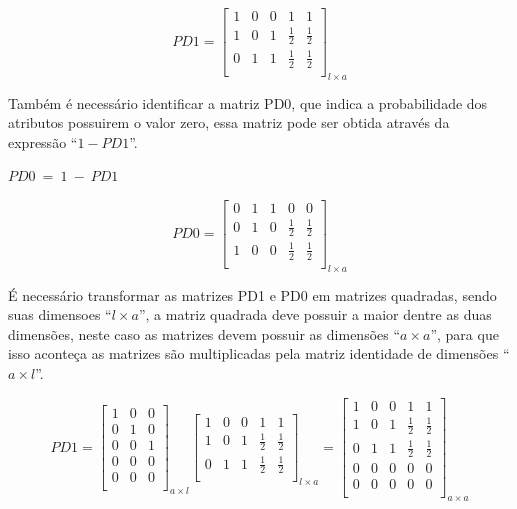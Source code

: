 $$PD1=\left[
\begin{array}{ccccc}
1 & 0 & 0 & 1 & 1 \\
1 & 0 & 1 & \frac{1}{2} & \frac{1}{2} \\
0 & 1 & 1 & \frac{1}{2} & \frac{1}{2} \\
\end{array}
\right]_{l \times a}$$

Também é necessário identificar a matriz PD0, que indica a probabilidade dos
atributos possuirem o valor zero, essa matriz pode ser obtida através da
expressão ``$1 - PD1$''.

\begin{center}
$PD0 \ = \ 1 \ - \ PD1$
\end{center}

$$PD0=\left[
\begin{array}{ccccc}
0 & 1 & 1 & 0 & 0 \\
0 & 1 & 0 & \frac{1}{2} & \frac{1}{2} \\
1 & 0 & 0 & \frac{1}{2} & \frac{1}{2} \\
\end{array}
\right]_{l \times a}$$

É necessário transformar as matrizes PD1 e PD0 em matrizes quadradas,
sendo suas dimensoes ``${l \times a}$'', a matriz quadrada deve possuir
a maior dentre as duas dimensões, neste caso as matrizes devem possuir
as dimensões ``${a \times a}$'', para que isso aconteça as matrizes são
multiplicadas pela matriz identidade de dimensões ``${a \times l}$''.

$$PD1=\left[
\begin{array}{ccc}
1 & 0 & 0 \\
0 & 1 & 0 \\
0 & 0 & 1 \\
0 & 0 & 0 \\
0 & 0 & 0 \\
\end{array}
\right]_{a \times l}
\left[
\begin{array}{ccccc}
1 & 0 & 0 & 1 & 1 \\
1 & 0 & 1 & \frac{1}{2} & \frac{1}{2} \\
0 & 1 & 1 & \frac{1}{2} & \frac{1}{2} \\
\end{array}
\right]_{l \times a}
= \left[
\begin{array}{ccccc}
1 & 0 & 0 & 1 & 1 \\
1 & 0 & 1 & \frac{1}{2} & \frac{1}{2} \\
0 & 1 & 1 & \frac{1}{2} & \frac{1}{2} \\
0 & 0 & 0 & 0 & 0 \\
0 & 0 & 0 & 0 & 0 \\
\end{array}
\right]_{a \times a}$$

